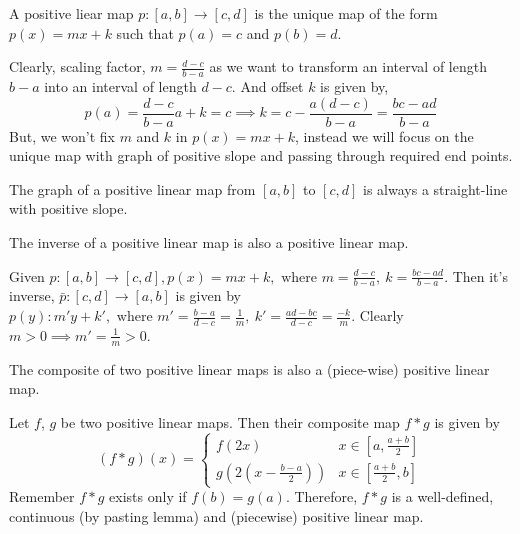 \begin{definition}
	A positive liear map $p : [a,b] \to [c,d]$ is the unique map of the form $p(x) = mx+k$ such that $p(a) = c$ and $p(b)=d$.
	\begin{commentary}
		Clearly, scaling factor, $m =  \frac{d-c}{b-a}$ as we want to transform an interval of length $b-a$ into an interval of length $d-c$.
		And offset $k$ is given by,
		\[ p(a) = \frac{d-c}{b-a}a+k = c \implies k = c - \frac{a(d-c)}{b-a} = \frac{bc-ad}{b-a} \]
		But, we won't fix $m$ and $k$ in $p(x) = mx+k$, instead we will focus on the unique map with graph of positive slope and passing through required end points.
	\end{commentary}
	The graph of a positive linear map from $[a,b]$ to $[c,d]$ is always a straight-line with positive slope.
\end{definition}

\begin{remark}
	The inverse of a positive linear map is also a positive linear map.
	\begin{commentary}
		Given $p : [a,b] \to [c,d], p(x) = mx+k,\text{ where } m = \frac{d-c}{b-a},\ k = \frac{bc-ad}{b-a}$.
		Then it's inverse, $\bar{p} : [c,d] \to [a,b]$ is given by $p(y) : m'y+k',\text{ where } m' = \frac{b-a}{d-c} = \frac{1}{m},\ k' =  \frac{ad-bc}{d-c} = \frac{-k}{m}$.
		Clearly $m > 0 \implies m' = \frac{1}{m} > 0$.
	\end{commentary}
\end{remark}

\begin{remark}
	The composite of two positive linear maps is also a (piece-wise) positive linear map.
	\begin{commentary} Let $f$, $g$ be two positive linear maps.
		Then their composite map $f \ast g$ is given by
	\[ (f \ast g) (x) = \begin{cases} f(2x) & x \in [a,\frac{a+b}{2}] \\ g(2\left(x-\frac{b-a}{2}\right)) & x \in [\frac{a+b}{2},b] \end{cases} \]
		Remember $f \ast g$ exists only if $f(b) = g(a)$.
		Therefore, $f \ast g$ is a well-defined, continuous (by pasting lemma) and (piecewise) positive linear map.
	\end{commentary}
\end{remark}

